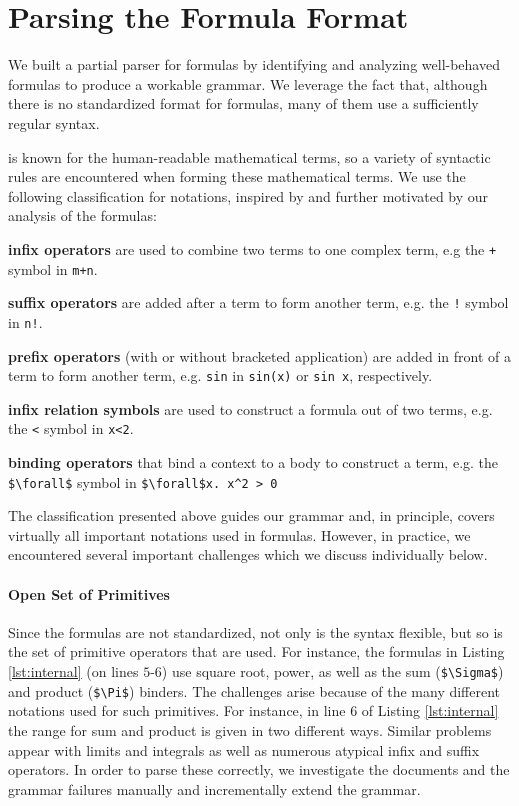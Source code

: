 \section{Parsing the \oeis Formula Format}\label{sec:form-parser}
We built a partial parser for \oeis formulas by identifying
and analyzing well-behaved formulas to produce a workable grammar.
We leverage the fact that, although there is no standardized format for \oeis formulas, many of them use a
sufficiently
regular syntax.

\oeis is known for the human-readable mathematical terms, so a variety of syntactic rules are encountered when forming
these mathematical terms. We use the following classification for notations, inspired by \cite{ranta} and
further motivated by our analysis of the \oeis formulas:
\begin{compactenum}
\item \textbf{infix operators} are used to combine two terms to one complex term, e.g the \lstinline!+! symbol in
\lstinline!m+n!.
\item \textbf{suffix operators} are added after a term to form another term, e.g. the \lstinline|!| symbol in
\lstinline|n!|.
\item \textbf{prefix operators} (with or without bracketed application) are added in front of a term to form another
term,
e.g. \lstinline|sin| in \lstinline|sin(x)| or \lstinline|sin x|, respectively.
\item \textbf{infix relation symbols} are used to construct a formula out of two terms, e.g. the \lstinline|<| symbol
in \lstinline|x<2|.
\item \textbf{binding operators} that bind a context to a body to construct a term, e.g. the
\lstinline[mathescape]|$\forall$| symbol in
\lstinline[mathescape]|$\forall$x. x^2 > 0|
\end{compactenum}

The classification presented above guides our grammar and, in principle, covers virtually all important notations used
in \oeis formulas. However, in practice, we encountered several important challenges which we discuss individually
below.

\paragraph{Open Set of Primitives} Since the formulas are not standardized, not only is
the syntax flexible, but so is the set of primitive operators that are used. For instance,
the formulas in Listing \ref{lst:internal} (on lines $5$-$6$) use square root, power, as
well as the sum (\lstinline[mathescape]|$\Sigma$|) and product
(\lstinline[mathescape]|$\Pi$|) binders. The challenges arise because of the many
different notations used for such primitives. For instance, in line $6$ of Listing
\ref{lst:internal} the range for sum and product is given in two different ways. Similar
problems appear with limits and integrals as well as numerous atypical infix and suffix
operators.  In order to parse these correctly, we investigate the documents and the
grammar failures manually and incrementally extend the grammar.

